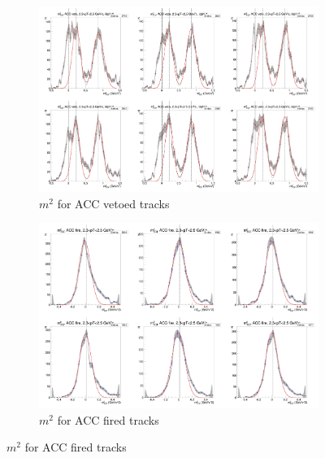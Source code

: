 \begin{figure}[H]
  \ContinuedFloat
    \begin{subfigure}{1\textwidth}
    \includegraphics[width=1\textwidth]{hiptfits/pos/PSm2_cent0_ich1_accfire0_ptbin9.jpg}
    \caption{$m^2$ for ACC vetoed tracks}
    \end{subfigure}
    \begin{subfigure}{1\textwidth}
    \includegraphics[width=1\textwidth]{hiptfits/pos/PSm2_cent0_ich1_accfire1_ptbin9.jpg}
    \caption{$m^2$ for ACC fired tracks}
    \end{subfigure}  
\end{figure}
